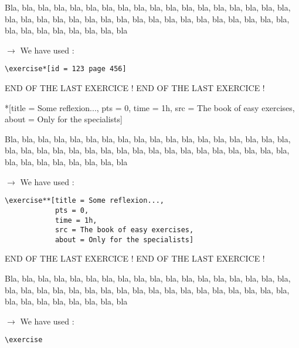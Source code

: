 \documentclass[12pt]{article}
\newcommand\blabla{%
		\noindent%
		Bla, bla, bla, bla, bla, bla, bla, bla, bla, bla, bla,
		bla, bla, bla, bla, bla, bla, bla, bla, bla, bla, bla,
		bla, bla, bla, bla, bla, bla, bla, bla, bla, bla, bla,
		bla, bla, bla, bla, bla, bla, bla, bla, bla, bla, bla
	}
\newcommand\codeused{%
		\blabla{} \medskip  \par
		\noindent $\rightarrow$ We have used :
	}
\begin{document}
\exercise*[id = 123 page 456]

\codeused{}
\begin{verbatim}
\exercise*[id = 123 page 456]
\end{verbatim}



\newpage \medskip \noindent END OF THE LAST EXERCICE ! END OF THE LAST EXERCICE !

\exercise**[title = Some reflexion..., pts = 0, time = 1h, src = The book of easy exercises, about = Only for the specialists]

\codeused{}
\begin{verbatim}
\exercise**[title = Some reflexion...,
            pts = 0,
            time = 1h,
            src = The book of easy exercises,
            about = Only for the specialists]
\end{verbatim}

\newpage \medskip \noindent END OF THE LAST EXERCICE ! END OF THE LAST EXERCICE !

\exercise

\codeused{}
\begin{verbatim}
\exercise
\end{verbatim}
\end{document}
